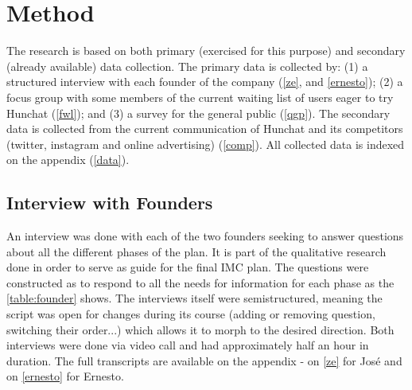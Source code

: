 \documentclass[11pt]{article}
\begin{document}
\section{Method}\label{method}
The research is based on both primary (exercised for this purpose) and secondary (already available) data collection. The primary data is collected by: (1) a structured interview with each founder of the company (\ref{ze}, and \ref{ernesto}); (2) a focus group with some members of the current waiting list of users eager to try Hunchat (\ref{fwl}); and (3) a survey for the general public (\ref{qgp}). The secondary data is collected from the current communication of Hunchat and its competitors (twitter, instagram and online advertising) (\ref{comp}). All collected data is indexed on the appendix (\ref{data}).

\subsection{Interview with Founders}
An interview was done with each of the two founders seeking to answer questions about all the different phases of the plan. It is part of the qualitative research done in order to serve as guide for the final IMC plan. The questions were constructed as to respond to all the needs for information for each phase as the \ref{table:founder} shows. The interviews itself were semistructured, meaning the script was open for changes during its course (adding or removing question, switching their order...) which allows it to morph to the desired direction. Both interviews were done via video call and had approximately half an hour in duration. The full transcripts are available on the appendix - on \ref{ze} for José and on \ref{ernesto} for Ernesto. 
\end{document}
